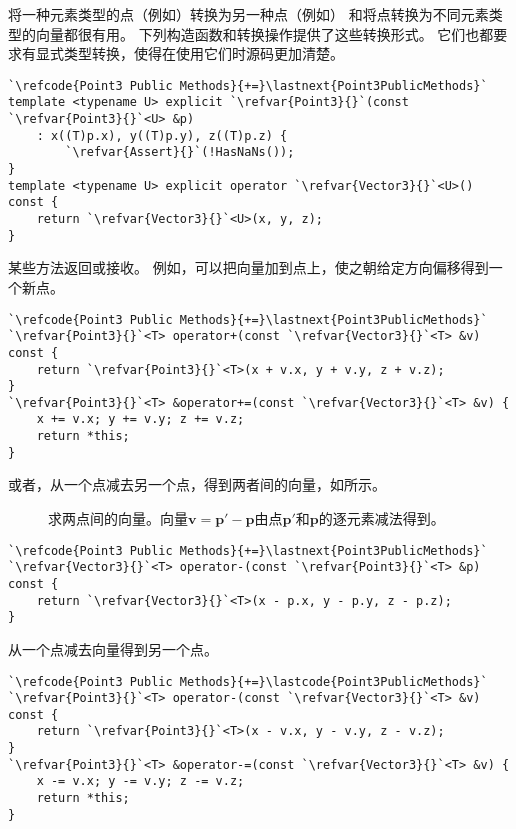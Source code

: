 将一种元素类型的点（例如）转换为另一种点（例如）
和将点转换为不同元素类型的向量都很有用。
下列构造函数和转换操作提供了这些转换形式。
它们也都要求有显式类型转换，使得在使用它们时源码更加清楚。
\begin{lstlisting}
`\refcode{Point3 Public Methods}{+=}\lastnext{Point3PublicMethods}`
template <typename U> explicit `\refvar{Point3}{}`(const `\refvar{Point3}{}`<U> &p)
    : x((T)p.x), y((T)p.y), z((T)p.z) { 
        `\refvar{Assert}{}`(!HasNaNs());
}
template <typename U> explicit operator `\refvar{Vector3}{}`<U>() const {
    return `\refvar{Vector3}{}`<U>(x, y, z);
}
\end{lstlisting}

某些方法返回或接收。
例如，可以把向量加到点上，使之朝给定方向偏移得到一个新点。
\begin{lstlisting}
`\refcode{Point3 Public Methods}{+=}\lastnext{Point3PublicMethods}`
`\refvar{Point3}{}`<T> operator+(const `\refvar{Vector3}{}`<T> &v) const {
    return `\refvar{Point3}{}`<T>(x + v.x, y + v.y, z + v.z);
}
`\refvar{Point3}{}`<T> &operator+=(const `\refvar{Vector3}{}`<T> &v) {
    x += v.x; y += v.y; z += v.z;
    return *this;
}
\end{lstlisting}

或者，从一个点减去另一个点，得到两者间的向量，如所示。
\begin{figure}
    \centering
    \caption{求两点间的向量。向量$\bm v=\bm p'-\bm p$由点$\bm p'$和$\bm p$的逐元素减法得到。}
    \label{fig:2.6}
\end{figure}

\begin{lstlisting}
`\refcode{Point3 Public Methods}{+=}\lastnext{Point3PublicMethods}`
`\refvar{Vector3}{}`<T> operator-(const `\refvar{Point3}{}`<T> &p) const {
    return `\refvar{Vector3}{}`<T>(x - p.x, y - p.y, z - p.z);
}
\end{lstlisting}

从一个点减去向量得到另一个点。
\begin{lstlisting}
`\refcode{Point3 Public Methods}{+=}\lastcode{Point3PublicMethods}`
`\refvar{Point3}{}`<T> operator-(const `\refvar{Vector3}{}`<T> &v) const {
    return `\refvar{Point3}{}`<T>(x - v.x, y - v.y, z - v.z);
}
`\refvar{Point3}{}`<T> &operator-=(const `\refvar{Vector3}{}`<T> &v) {
    x -= v.x; y -= v.y; z -= v.z;
    return *this;
}
\end{lstlisting}

